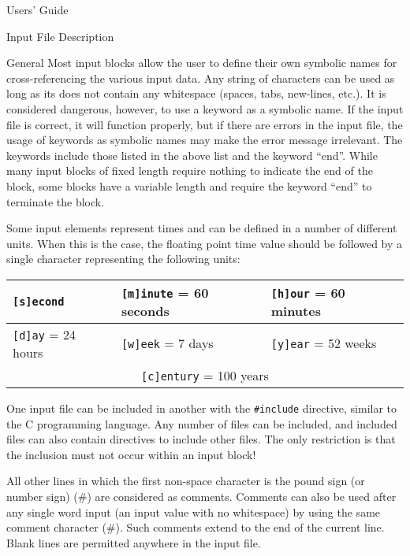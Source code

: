 \begin{chapter}{Users' Guide\label{app:user.guide}}
\begin{section}{Input File Description\label{app:user.input}}
\begin{subsection}{General}
      Most input blocks allow the user to define their own symbolic
      names for cross-referencing the various input data.  Any string
      of characters can be used as long as its does not contain any
      whitespace (spaces, tabs, new-lines, etc.).  It is considered
      dangerous, however, to use a keyword as a symbolic name.  If the
      input file is correct, it will function properly, but if there
      are errors in the input file, the usage of keywords as symbolic
      names may make the error message irrelevant.  The keywords
      include those listed in the above list and the keyword ``end''.
      While many input blocks of fixed length require nothing to
      indicate the end of the block, some blocks have a variable
      length and require the keyword ``end'' to terminate the block.
      
      Some input elements represent times and can be defined in a
      number of different units.  When this is the case, the floating
      point time value should be followed by a single character
      representing the following units:

      \begin{center}
        \renewcommand{\baselinestretch}{1}\normalsize
        \begin{tabular}{|l|l|l|}
          \hline
          \texttt{[s]econd} & 
          \texttt{[m]inute} = 60 seconds& 
          \texttt{[h]our} = 60 minutes\\\hline
          \texttt{[d]ay} = 24 hours& 
          \texttt{[w]eek} = 7 days& 
          \texttt{[y]ear} = 52 weeks\\\hline
          \multicolumn{3}{|c|}{\texttt{[c]entury} = 100 years}\\\hline
        \end{tabular}
      \end{center}

      One input file can be included in another with the
      \texttt{\#include} directive, similar to the C programming
      language.  Any number of files can be included, and included
      files can also contain directives to include other files.  The
      only restriction is that the inclusion must not occur within an
      input block!
      
      All other lines in which the first non-space character is the
      pound sign (or number sign) (\#) are considered as comments.
      Comments can also be used after any single word input (an input
      value with no whitespace) by using the same comment character
      (\#).  Such comments extend to the end of the current line.
      Blank lines are permitted anywhere in the input file.
      

\end{subsection}
\end{section}
\end{chapter}

